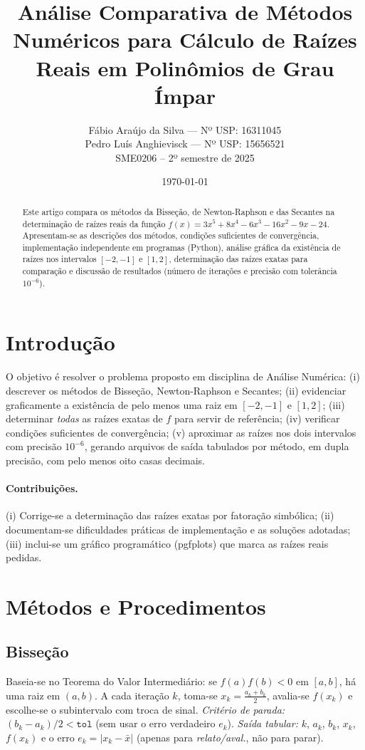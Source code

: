 \documentclass[12pt,a4paper]{article}
\title{Análise Comparativa de Métodos Numéricos para Cálculo de Raízes Reais em Polinômios de Grau Ímpar}
\author{
  Fábio Araújo da Silva --- Nº USP: 16311045 \\[3pt]
  Pedro Luís Anghievisck --- Nº USP: 15656521 \\[3pt]
  \normalsize SME0206 -- 2º semestre de 2025
}
\date{\today}
\begin{document}
\maketitle

\begin{abstract}
Este artigo compara os métodos da Bisseção, de Newton-Raphson e das Secantes na determinação de raízes reais da função
$f(x)=3x^{5}+8x^{4}-6x^{3}-16x^{2}-9x-24$.
Apresentam-se as descrições dos métodos, condições suficientes de convergência, implementação independente em programas (Python),
análise gráfica da existência de raízes nos intervalos $[-2,-1]$ e $[1,2]$, determinação das raízes exatas para comparação e
discussão de resultados (número de iterações e precisão com tolerância $10^{-6}$).
\end{abstract}

\section{Introdução}
O objetivo é resolver o problema proposto em disciplina de Análise Numérica:
(i) descrever os métodos de Bisseção, Newton-Raphson e Secantes; (ii) evidenciar graficamente a existência de pelo menos uma raiz em
$[-2,-1]$ e $[1,2]$; (iii) determinar \emph{todas} as raízes exatas de $f$ para servir de referência;
(iv) verificar condições suficientes de convergência; (v) aproximar as raízes nos dois intervalos com precisão $10^{-6}$,
gerando arquivos de saída tabulados por método, em dupla precisão, com pelo menos oito casas decimais.

\paragraph{Contribuições.}
(i) Corrige-se a determinação das raízes exatas por fatoração simbólica; (ii) documentam-se dificuldades práticas de implementação
e as soluções adotadas; (iii) inclui-se um gráfico programático (pgfplots) que marca as raízes reais pedidas.

\section{Métodos e Procedimentos}
\subsection{Bisseção}
Baseia-se no Teorema do Valor Intermediário: se $f(a)f(b)<0$ em $[a,b]$, há uma raiz em $(a,b)$.
A cada iteração $k$, toma-se $x_k=\tfrac{a_k+b_k}{2}$, avalia-se $f(x_k)$ e escolhe-se o subintervalo com troca de sinal.
\emph{Critério de parada:} $(b_k-a_k)/2<\texttt{tol}$ (sem usar o erro verdadeiro $e_k$).
\emph{Saída tabular:} $k$, $a_k$, $b_k$, $x_k$, $f(x_k)$ e o erro $e_k=|x_k-\bar{x}|$ (apenas para \emph{relato/aval.}, não para parar).
\end{document}
